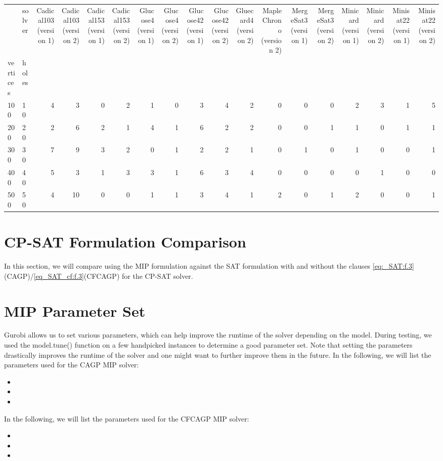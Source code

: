 \begin{tabular}{llrrrrrrrrrrrrrrrr}
\toprule
 & solver & Cadical103 (version 1) & Cadical103 (version 2) & Cadical153 (version 1) & Cadical153 (version 2) & Glucose4 (version 1) & Glucose4 (version 2) & Glucose42 (version 1) & Glucose42 (version 2) & Gluecard4 (version 2) & MapleChrono (version 2) & MergeSat3 (version 1) & MergeSat3 (version 2) & Minicard (version 1) & Minicard (version 2) & Minisat22 (version 1) & Minisat22 (version 2) \\
vertices & holes &  &  &  &  &  &  &  &  &  &  &  &  &  &  &  &  \\
\midrule
100 & 10 & 4 & 3 & 0 & 2 & 1 & 0 & 3 & 4 & 2 & 0 & 0 & 0 & 2 & 3 & 1 & 5 \\
\cline{1-18}
200 & 20 & 2 & 6 & 2 & 1 & 4 & 1 & 6 & 2 & 2 & 0 & 0 & 1 & 1 & 0 & 1 & 1 \\
\cline{1-18}
300 & 30 & 7 & 9 & 3 & 2 & 0 & 1 & 2 & 2 & 1 & 0 & 1 & 0 & 1 & 0 & 0 & 1 \\
\cline{1-18}
400 & 40 & 5 & 3 & 1 & 3 & 3 & 1 & 6 & 3 & 4 & 0 & 0 & 0 & 0 & 1 & 0 & 0 \\
\cline{1-18}
500 & 50 & 4 & 10 & 0 & 0 & 1 & 1 & 3 & 4 & 1 & 2 & 0 & 1 & 2 & 0 & 0 & 1 \\
\cline{1-18}
\bottomrule
\end{tabular}


\section{CP-SAT Formulation Comparison}
In this section, we will compare using the MIP formulation against the SAT formulation with and without the clauses \cref{eq:_SAT:f.3}(CAGP)/\cref{eq_SAT_cf:f.3}(CFCAGP) for the CP-SAT solver. 

\section{MIP Parameter Set}
Gurobi allows us to set various parameters, which can help improve the runtime of the solver depending on the model. During testing, we used the model.tune() function on a few handpicked instances to determine a good parameter set. Note that setting the parameters drastically improves the runtime of the solver and one might want to further improve them in the future. In the following, we will list the parameters used for the CAGP MIP solver:
\begin{itemize}
  \item 
  \item 
  \item 
\end{itemize}
In the following, we will list the parameters used for the CFCAGP MIP solver:
\begin{itemize}
  \item 
  \item 
  \item 
\end{itemize}

